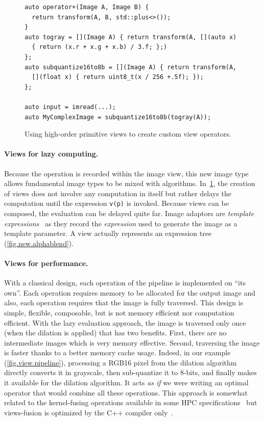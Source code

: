 \begin{figure}
  \noindent
  \begin{verbatim}
auto operator+(Image A, Image B) {
  return transform(A, B, std::plus<>());
}
auto togray = [](Image A) { return transform(A, [](auto x)
  { return (x.r + x.g + x.b) / 3.f; };)
};
auto subquantize16to8b = [](Image A) { return transform(A,
  [](float x) { return uint8_t(x / 256 +.5f); });
};

auto input = imread(...);
auto MyComplexImage = subquantize16to8b(togray(A));
  \end{verbatim}

  \caption{Using high-order primitive views to create custom view operators.}
  \label{fig.view.highorder}
\end{figure}

\paragraph{Views for lazy computing.} Because the operation is recorded within the image view, this new image type
allows fundamental image types to be mixed with algorithms. In~\cref{fig.view.highorder}, the creation of views does not
involve any computation in itself but rather delays the computation until the expression \texttt{v(p)} is invoked.
Because views can be composed, the evaluation can be delayed quite far. Image adaptors are \emph{template
  expressions}~\parencite{veldhuizen.1995.expression, veldhuizen.2000.blitz} as they record the \emph{expression} used to
generate the image as a template parameter. A view actually represents an expression tree (\cref{fig.new.alphablend}).

\paragraph{Views for performance.} With a classical design, each operation of the pipeline is implemented on ``its
own''. Each operation requires memory to be allocated for the output image and also, each operation requires that the
image is fully traversed. This design is simple, flexible, composable, but is not memory efficient nor computation
efficient. With the lazy evaluation approach, the image is traversed only once (when the dilation is applied) that has
two benefits. First, there are no intermediate images which is very memory effective. Second, traversing the image is
faster thanks to a better memory cache usage. Indeed, in our example (\cref{fig.view.pipeline}), processing a RGB16
pixel from the dilation algorithm directly converts it in grayscale, then sub-quantize it to 8-bits, and finally makes
it available for the dilation algorithm. It acts \emph{as if} we were writing an optimal operator that would combine all
these operations. This approach is somewhat related to the kernel-fusing operations available in some HPC
specifications~\parencite{openvx.2019} but views-fusion is optimized by the C++ compiler
only~\parencite{brown.2018.ranges}.


